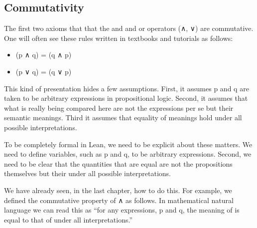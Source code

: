 \documentclass[letterpaper,10pt,english]{sphinxmanual}
\begin{document}
\subsection{Commutativity}
\label{\detokenize{A_01_Propositional_Logic:commutativity}}
\sphinxAtStartPar
The first two axioms that that the and and or operators
(∧, ∨) are commutative. One will often see these rules
written in textbooks and tutorials as follows:
\begin{itemize}
\item {} 
\sphinxAtStartPar
(p ∧ q) = (q ∧ p)

\item {} 
\sphinxAtStartPar
(p ∨ q) = (q ∨ p)

\end{itemize}

\sphinxAtStartPar
This kind of presentation hides a few assumptions. First,
it assumes p and q are taken to be arbitrary expressions
in propositional logic. Second, it assumes that what is
really being compared here are not the expressions per se
but their semantic meanings. Third it assumes that equality
of meanings hold under all possible interpretations.

\sphinxAtStartPar
To be completely formal in Lean, we need to be explicit
about these matters. We need to define variables, such as
p and q, to be arbitrary expressions. Second, we need to
be clear that the quantities that are equal are not the
propositions themselves but their  under all
possible interpretations.

\sphinxAtStartPar
We have already seen, in the last chapter, how to do this.
For example, we defined the commutative property of ∧ as
follows. In mathematical natural language we can read this
as “for any expressions, p and q, the meaning of 
is equal to that of  under all interpretations.”

\begin{sphinxVerbatim}[commandchars=\\\{\}]
 
         
             
  
\end{sphinxVerbatim}
\end{document}
